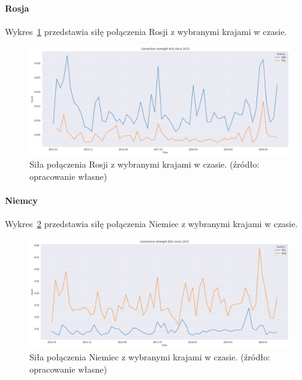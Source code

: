 \documentclass[11pt]{report}
\begin{document}
    \paragraph{Rosja}

    Wykres~\ref{fig:RUSConnection} przedstawia siłę połączenia Rosji z wybranymi krajami w czasie.

    \begin{figure}[!htp]
        \centering
        \includegraphics[width=\linewidth]{fig/RUS/RUSConnection.png}
        \caption{Siła połączenia Rosji z wybranymi krajami w czasie. (źródło: opracowanie własne)}
        \label{fig:RUSConnection}
    \end{figure}

    \paragraph{Niemcy}

    Wykres~\ref{fig:DEUConnection} przedstawia siłę połączenia Niemiec z wybranymi krajami w czasie.

    \begin{figure}[!htp]
        \centering
        \includegraphics[width=\linewidth]{fig/DEU/DEUConnection.png}
        \caption{Siła połączenia Niemiec z wybranymi krajami w czasie. (źródło: opracowanie własne)}
        \label{fig:DEUConnection}
    \end{figure}
\end{document}
